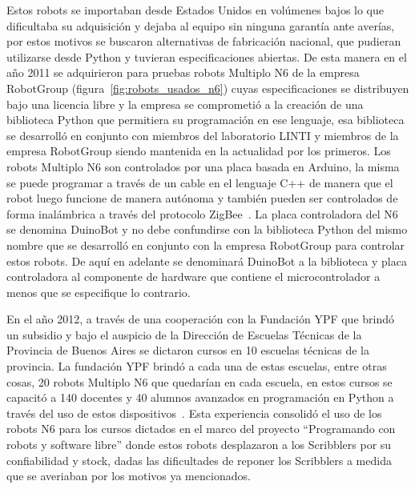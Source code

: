 Estos robots se importaban desde Estados Unidos en volúmenes bajos lo que
dificultaba su adquisición y dejaba al equipo sin ninguna garantía ante
averías, por estos motivos se buscaron alternativas de fabricación nacional,
que pudieran utilizarse desde Python y tuvieran especificaciones abiertas.
De esta manera en el año 2011 se adquirieron para pruebas robots Multiplo N6
de la empresa RobotGroup (figura~\ref{fig:robots_usados_n6})
cuyas especificaciones se distribuyen bajo una licencia libre y
la empresa se comprometió a la creación de una biblioteca Python que permitiera
su programación en ese lenguaje, esa biblioteca se desarrolló en conjunto
con miembros del laboratorio LINTI y miembros de la empresa RobotGroup siendo
mantenida en la actualidad por los primeros. Los robots Multiplo N6 son
controlados por una placa basada en Arduino, la misma se puede programar
a través de un cable en el lenguaje C++ de manera que el robot luego funcione
de manera autónoma y también pueden ser controlados de forma inalámbrica
a través del protocolo ZigBee~\citep{diaz_aprendiendo_2012}. La placa
controladora del N6 se denomina DuinoBot y no debe confundirse con la biblioteca
Python del mismo nombre que se desarrolló en conjunto con la empresa RobotGroup
para controlar estos robots. De aquí en adelante se denominará DuinoBot a la
biblioteca y placa controladora al componente de hardware que contiene el
microcontrolador a menos que se especifique lo contrario.



En el año 2012, a través de una cooperación con la Fundación YPF que brindó
un subsidio y bajo el auspicio de la Dirección de Escuelas Técnicas de la
Provincia de Buenos Aires se dictaron cursos en 10 escuelas técnicas de la
provincia. La fundación YPF brindó a cada una de estas escuelas, entre otras
cosas, 20 robots Multiplo N6 que quedarían en cada escuela, en estos cursos
se capacitó a 140 docentes y 40 alumnos avanzados en programación en Python
a través del uso de estos dispositivos~\citep{diaz_aprendiendo_2012}.
Esta experiencia consolidó el uso de
los robots N6 para los cursos dictados en el marco del proyecto
``Programando con robots y software libre'' donde estos robots desplazaron
a los Scribblers por su confiabilidad y stock, dadas las dificultades de
reponer los Scribblers a medida que se averiaban por los motivos
ya mencionados.


